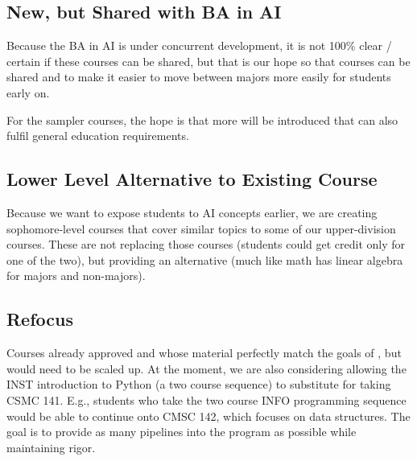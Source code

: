 \documentclass[
10pt, %
a4paper, %
oneside, %
headinclude,footinclude, %
BCOR5mm, %
]{scrartcl}
\begin{document}
  

  \subsection{New, but Shared with BA in AI}

  Because the BA in AI is under concurrent development, it is not 100\% clear / certain if these courses can be shared, but that is our hope so that courses can be shared and to make it easier to move between majors more easily for students early on.  

  For the sampler courses, the hope is that more will be introduced that can also fulfil general education requirements.

  

    \subsection{Lower Level Alternative to Existing Course}

    Because we want to expose students to AI concepts earlier, we are creating sophomore-level courses that cover similar topics to some of our upper-division courses.  These are not replacing those courses (students could get credit only for one of the two), but providing an alternative (much like math has linear algebra for majors and non-majors).

    



  \subsection{Refocus}

    Courses already approved and whose material perfectly match the goals of \short{}, but would need to be scaled up.  At the moment, we are also considering allowing the INST introduction to Python (a two course sequence) to substitute for taking CSMC 141.  E.g., students who take the two course INFO programming sequence would be able to continue onto CMSC 142, which focuses on data structures.  The goal is to provide as many pipelines into the program as possible while maintaining rigor.
    
\end{document}
